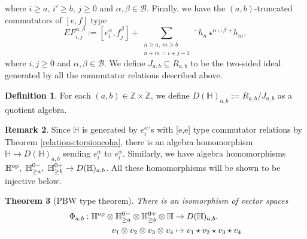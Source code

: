 \documentclass[10pt]{amsart}
\newcommand{\BZ}{\mathbb{Z}}
\newcommand{\BH}{\mathbb{H}}
\newcommand{\CB}{\mathcal{B}}
\newcommand{\op}{\textnormal{op}}
\newcommand{\+}{{}^+}
\newtheorem{theorem}{Theorem}[section]
\theoremstyle{definition}
\theoremstyle {definition}
\newtheorem{remark}[theorem]{Remark}
\theoremstyle {definition}
\newtheorem{definition}[theorem]{Definition}
\begin{document}
where $i\geq a$, $i'\geq b$, $j\geq 0$ and $\alpha,\beta\in \CB$. Finally, we have the $(a,b)$-truncated commutators of $[e,f]$ type
$$EF^{\alpha,\beta}_{i,j}:=[e^\alpha_i, f^\beta_j]+\sum_{\substack{n\geq a,\ m\geq b\\ n+m=i+j-1}} {}^{-}h_n\star^{\alpha\cup \beta}{}^{+}h_m,
$$
where $i, j\geq 0$ and $\alpha,\beta\in \CB$. We define $J_{a,b}\subseteq R_{a,b}$ to be the two-sided ideal generated by all the commutator relations described above. 

\begin{definition}
For each $(a,b)\in \BZ\times\BZ$, we define $D(\BH)_{a,b}:=R_{a,b}/J_{a,b}$ as a quotient algebra. 
\end{definition}

\begin{remark}\label{rem: each factor maps}
    Since $\BH$ is generated by $e_i^\alpha$'s with [e,e] type commutator relations by Theorem \ref{relations:torsioncoha}, there is an algebra homomorphism $\BH\rightarrow D(\BH)_{a,b}$ sending $e^\alpha_i$ to $e^\alpha_i$. Similarly, we have algebra homomorphisms $\BH^{\op},\ \BH^{0-}_{\geq a},\ \BH^{0+}_{\geq b}\rightarrow D(\BH)_{a,b}$. All these homomorphisms will be shown to be injective below. 
\end{remark}

\begin{theorem}[PBW type theorem] \label{thm: PBW}
    There is an isomorphism of vector spaces
    \begin{align*}
        \Phi_{a,b}:\BH^{\op}\otimes \BH^{0-}_{\geq a}\otimes \BH^{0+}_{\geq b}\otimes \BH&\rightarrow D(\BH)_{a,b}.\\
        v_1\otimes v_2\otimes v_3\otimes v_4&\mapsto v_1\star v_2\star v_3\star v_4
    \end{align*}
\end{theorem}
\end{document}
